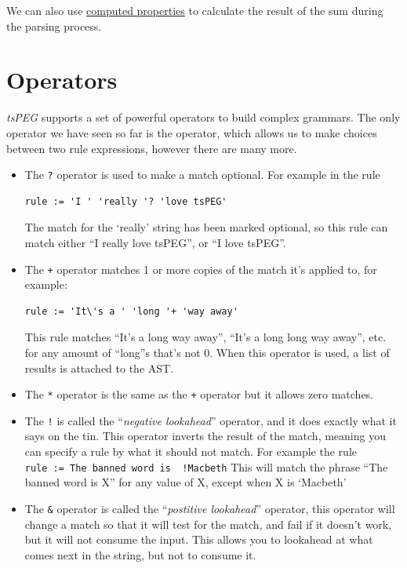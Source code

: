 We can also use \protect\hyperlink{computed-properties}{computed
properties} to calculate the result of the sum during the parsing
process.

\hypertarget{operators}{\section{Operators}\label{operators}}

\emph{tsPEG} supports a set of powerful operators to build complex
grammars. The only operator we have seen so far is the
\texttt{\textbar{}} operator, which allows us to make choices between
two rule expressions, however there are many more.

\begin{itemize}
\item
  The \texttt{?} operator is used to make a match optional. For example
  in the rule

\begin{verbatim}
rule := 'I ' 'really '? 'love tsPEG'
\end{verbatim}

  The match for the `really' string has been marked optional, so this
  rule can match either ``I really love tsPEG'', or ``I love tsPEG''.
\item
  The \texttt{+} operator matches 1 or more copies of the match it's
  applied to, for example:

\begin{verbatim}
rule := 'It\'s a ' 'long '+ 'way away'
\end{verbatim}

  This rule matches ``It's a long way away'', ``It's a long long way
  away'', etc. for any amount of ``long''s that's not 0. When this
  operator is used, a list of results is attached to the AST.
\item
  The \texttt{*} operator is the same as the \texttt{+} operator but it
  allows zero matches.
\item
  The \texttt{!} is called the ``\emph{negative lookahead}'' operator,
  and it does exactly what it says on the tin. This operator inverts the
  result of the match, meaning you can specify a rule by what it should
  not match. For example the rule
  \texttt{rule\ :=\ \textquotesingle{}The\ banned\ word\ is\ \textquotesingle{}\ !\textquotesingle{}Macbeth\textquotesingle{}}
  This will match the phrase ``The banned word is X'' for any value of
  X, except when X is `Macbeth'
\item
  The \texttt{\&} operator is called the ``\emph{postitive lookahead}''
  operator, this operator will change a match so that it will test for
  the match, and fail if it doesn't work, but it will not consume the
  input. This allows you to lookahead at what comes next in the string,
  but not to consume it.
\end{itemize}

